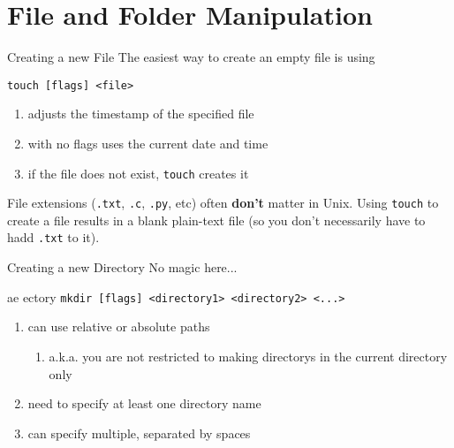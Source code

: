 %
\section{File and Folder Manipulation}
\label{sec:file_and_folder_manipulation}

\begin{frame}[fragile]{Creating a new File}
  The easiest way to create an empty file is using

  \begin{block}{}
    \texttt{touch [flags] <file>}
    \begin{enumerate}[\--]
      \item adjusts the timestamp of the specified file
      \item with no flags uses the current date and time
      \item if the file does not exist, \texttt{touch} creates it
    \end{enumerate}
    \vspace*{1em}
  \end{block}

  File extensions (\texttt{.txt}, \texttt{.c}, \texttt{.py}, etc) often \textbf{don't} matter in Unix.
  Using \texttt{touch} to create a file results in a blank plain-text file (so you don't necessarily
  have to hadd \texttt{.txt} to it).
\end{frame}

\begin{frame}[fragile]{Creating a new Directory}
  No magic here...

  \begin{block}{ae ectory}
    \texttt{mkdir [flags] <directory1> <directory2> <...>}
    \begin{enumerate}[\--]
      \item can use relative or absolute paths
      \begin{enumerate}[\--]
        \item a.k.a. you are not restricted to making directorys in the current directory only
      \end{enumerate}
      \item need to specify at least one directory name
      \item can specify multiple, separated by spaces
    \end{enumerate}
    \vspace*{1em}
  \end{block}
\end{frame}

